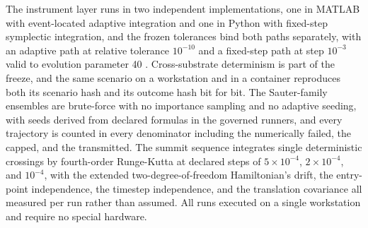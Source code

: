 \documentclass[aps,pre,reprint,nofootinbib,floatfix]{revtex4-2}
\begin{document}
The instrument layer runs in two independent implementations, one in
MATLAB with event-located adaptive integration and one in Python with
fixed-step symplectic integration, and the frozen tolerances bind both
paths separately, with an adaptive path at relative tolerance
$10^{-10}$ and a fixed-step path at step $10^{-3}$ valid to evolution
parameter 40 \cite{HairerLubichWanner}.  Cross-substrate determinism is
part of the freeze, and the same scenario on a workstation and in a
container reproduces both its scenario hash and its outcome hash bit
for bit.  The Sauter-family ensembles are brute-force with no
importance sampling and no adaptive seeding, with seeds derived from
declared formulas in the governed runners, and every trajectory is
counted in every denominator including the numerically failed, the
capped, and the transmitted.  The summit sequence integrates single
deterministic crossings by fourth-order Runge-Kutta at declared steps
of $5\times10^{-4}$, $2\times10^{-4}$, and $10^{-4}$, with the
extended
two-degree-of-freedom Hamiltonian's drift, the entry-point
independence, the timestep independence, and the translation covariance
all measured per run rather than assumed.  All runs executed on a
single workstation and require no special hardware.
\end{document}
